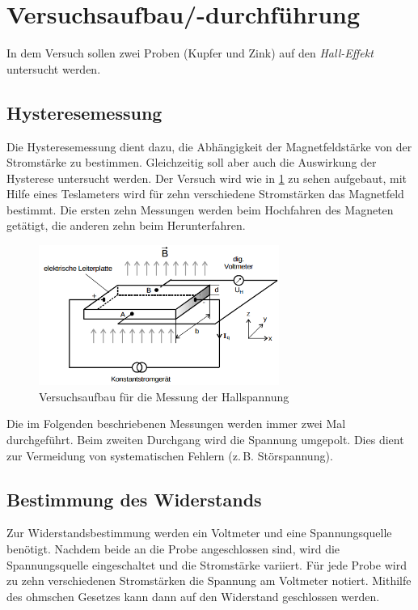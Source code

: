 \section{Versuchsaufbau/-durchführung}
In dem Versuch sollen zwei Proben (Kupfer und Zink) auf den \emph{Hall-Effekt} untersucht werden. %

\subsection{Hysteresemessung}
Die Hysteresemessung dient dazu, die Abhängigkeit der Magnetfeldstärke
von der Stromstärke zu bestimmen.
Gleichzeitig soll aber auch die Auswirkung der Hysterese untersucht werden.
 Der Versuch wird wie in \ref{fig: auf_hall} zu sehen aufgebaut, %
mit Hilfe eines Teslameters wird für zehn verschiedene Stromstärken das Magnetfeld bestimmt. %
Die ersten zehn Messungen werden beim Hochfahren des Magneten getätigt, %
die anderen zehn beim Herunterfahren.

\begin{figure}
  \centering
  \includegraphics[width=0.7\textwidth]{pics/Halleffekt_aufbau.png}
  \caption{Versuchsaufbau für die Messung der Hallspannung}
  \label{fig: auf_hall}
\end{figure}


Die im Folgenden beschriebenen Messungen werden immer zwei Mal durchgeführt. %
Beim zweiten Durchgang wird die Spannung umgepolt. %
Dies dient zur Vermeidung von systematischen Fehlern (z.\,B. Störspannung). %


\subsection{Bestimmung des Widerstands}
Zur Widerstandsbestimmung werden ein Voltmeter und
eine Spannungsquelle benötigt.
Nachdem beide an die Probe angeschlossen sind,
wird die Spannungsquelle eingeschaltet und die Stromstärke variiert.
Für jede Probe wird zu zehn verschiedenen Stromstärken
die Spannung am Voltmeter notiert.
Mithilfe des ohmschen Gesetzes kann dann auf den Widerstand geschlossen werden.

